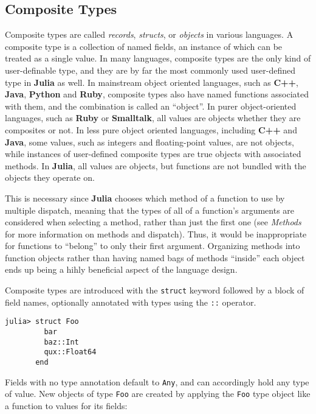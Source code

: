 \documentclass[
]{article}
\begin{document}
\hypertarget{composite-types}{%
\subsection{Composite Types}\label{composite-types}}

Composite types are called \emph{records}, \emph{structs}, or
\emph{objects} in various languages. A composite type is a collection of
named fields, an instance of which can be treated as a single value. In
many languages, composite types are the only kind of user-definable
type, and they are by far the most commonly used user-defined type in
\textbf{Julia} as well. In mainstream object oriented languages, such as
\textbf{C++}, \textbf{Java}, \textbf{Python} and \textbf{Ruby},
composite types also have named functions associated with them, and the
combination is called an ``object''. In purer object-oriented languages,
such as \textbf{Ruby} or \textbf{Smalltalk}, all values are objects
whether they are composites or not. In less pure object oriented
languages, including \textbf{C++} and \textbf{Java}, some values, such
as integers and floating-point values, are not objects, while instances
of user-defined composite types are true objects with associated
methods. In \textbf{Julia}, all values are objects, but functions are
not bundled with the objects they operate on.

This is necessary since \textbf{Julia} chooses which method of a
function to use by multiple dispatch, meaning that the types of all of a
function's arguments are considered when selecting a method, rather than
just the first one (see \emph{Methods} for more information on methods
and dispatch). Thus, it would be inappropriate for functions to
``belong'' to only their first argument. Organizing methods into
function objects rather than having named bags of methods ``inside''
each object ends up being a hihly beneficial aspect of the language
design.

Composite types are introduced with the \texttt{struct} keyword followed
by a block of field names, optionally annotated with types using the
\texttt{::} operator.

\begin{verbatim}
julia> struct Foo
         bar
         baz::Int
         qux::Float64
       end
\end{verbatim}

Fields with no type annotation default to \texttt{Any}, and can
accordingly hold any type of value. New objects of type \texttt{Foo} are
created by applying the \texttt{Foo} type object like a function to
values for its fields:
\end{document}
